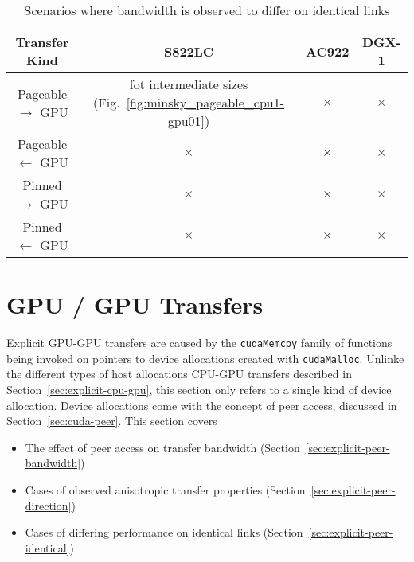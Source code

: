 \begin{table}[ht]
	\centering
	\caption[Matrix: Transfer rate vary on identical links]{Scenarios where bandwidth is observed to differ on identical links}
	\label{tab:explicit-identical}
	\begin{tabular}{|c|c|c|c|}
		\hline
		\textbf{Transfer Kind}     & \textbf{S822LC}                                                    & \textbf{AC922} & \textbf{DGX-1} \\ \hline 
		Pageable $\rightarrow$ GPU & fot intermediate sizes (Fig.~\ref{fig:minsky_pageable_cpu1-gpu01}) & $\times$       & $\times$       \\ \hline
		Pageable $\leftarrow$ GPU  & $\times$                                                           & $\times$       & $\times$       \\ \hline
		Pinned $\rightarrow$ GPU   & $\times$                                                           & $\times$       & $\times$       \\ \hline
		Pinned $\leftarrow$ GPU    & $\times$                                                           & $\times$       & $\times$       \\ \hline
	\end{tabular}
\end{table}

\section{GPU / GPU Transfers}
\label{sec:explicit-gpu-gpu}

Explicit GPU-GPU transfers are caused by the \texttt{cudaMemcpy} family of functions being invoked on pointers to device allocations created with \texttt{cudaMalloc}.
Unlinke the different types of host allocations CPU-GPU transfers described in Section~\ref{sec:explicit-cpu-gpu}, this section only refers to a single kind of device allocation.
Device allocations come with the concept of peer access, discussed in Section~\ref{sec:cuda-peer}.
This section covers
\begin{itemize}
	\item The effect of peer access on transfer bandwidth (Section~\ref{sec:explicit-peer-bandwidth})
	\item Cases of observed anisotropic transfer properties (Section~\ref{sec:explicit-peer-direction})
	\item Cases of differing performance on identical links (Section~\ref{sec:explicit-peer-identical})
\end{itemize}

